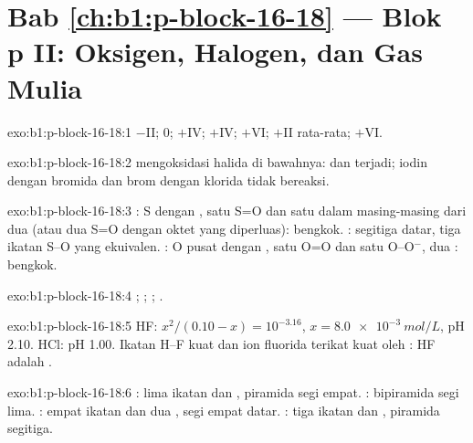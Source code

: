 \section*{Bab \ref{ch:b1:p-block-16-18} --- Blok p II: Oksigen, Halogen, dan Gas Mulia}

\begin{solution}{exo:b1:p-block-16-18:1}
 $-$II;  0;  $+$IV;  $+$IV; 
$+$VI;  $+$II rata-rata;  $+$VI.
\end{solution}

\begin{solution}{exo:b1:p-block-16-18:2}
 mengoksidasi halida di bawahnya:  dan
 terjadi; iodin dengan bromida dan brom
dengan klorida tidak bereaksi.
\end{solution}

\begin{solution}{exo:b1:p-block-16-18:3}
: S dengan , satu S=O dan satu 
dalam masing-masing dari dua  (atau dua S=O dengan oktet
yang diperluas): bengkok. : segitiga datar, tiga ikatan S--O yang
ekuivalen. : O pusat dengan , satu O=O dan
satu O--O$^-$, dua : bengkok.
\end{solution}

\begin{solution}{exo:b1:p-block-16-18:4}
; ;
; .
\end{solution}

\begin{solution}{exo:b1:p-block-16-18:5}
HF: $x^2/(0.10 - x) = 10^{-3.16}$, $x = \qty{8.0e-3}{mol/L}$, pH 2.10. HCl:
pH 1.00. Ikatan H--F kuat dan ion fluorida terikat kuat oleh : HF adalah .
\end{solution}

\begin{solution}{exo:b1:p-block-16-18:6}
: lima ikatan dan , piramida segi empat.
: bipiramida segi lima. : empat ikatan dan dua , segi empat datar. : tiga ikatan dan , piramida segitiga.
\end{solution}

